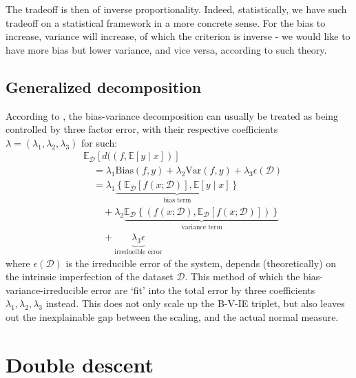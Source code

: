 \documentclass[
  journal=largetwo,
  year=2025,
  volume=37,
]{cup-journal}
\begin{document}
The tradeoff is then of inverse proportionality. Indeed, statistically, we have such tradeoff on a statistical framework in a more concrete sense. For the bias to increase, variance will increase, of which the criterion is inverse - we would like to have more bias but lower variance, and vice versa, according to such theory.

\subsection{Generalized decomposition}

According to \cite{domingos_unified_aaai_2000,domingos_unified_2000}, the bias-variance decomposition can usually be treated as being controlled by three factor error, with their respective coefficients $\lambda=(\lambda_{1},\lambda_{2},\lambda_{3})$ for such: 
    \noindent 
    \begin{equation*}
        \begin{split}
            &\mathbb{E}_{\mathcal{D}} \left[d((f,\mathbb{E}[y\mid x])\right] \\
            & \quad = \lambda_{1} \mathrm{Bias}(f,y) + \lambda_{2}\mathrm{Var}(f,y)+ \lambda_{3}\epsilon(\mathcal{D})\\ 
            & \quad = \lambda_{1}\underbrace{\left\{ \mathbb{E}_{\mathcal{D}}[f(x;\mathcal{D})] , \mathbb{E}[y\mid x] \right\}}_{\text{bias term}} \\
            &\quad\quad +\lambda_{2} \underbrace{\mathbb{E}_{\mathcal{D}} \left\{(f(x;\mathcal{D}), \mathbb{E}_{\mathcal{D}}[f(x;\mathcal{D})])\right\}}_{\text{variance term}} \\
            &\quad\quad +\underbrace{\lambda_{3}\epsilon}_{\text{irreducible error}}
        \end{split}
        \end{equation*}
where $\epsilon(\mathcal{D})$ is the irreducible error of the system, depends (theoretically) on the intrinsic imperfection of the dataset $\mathcal{D}$. This method of which the bias-variance-irreducible error are `fit' into the total error by three coefficients $\lambda_{1},\lambda_{2},\lambda_{3}$ instead. This does not only scale up the B-V-IE triplet, but also leaves out the inexplainable gap between the scaling, and the actual normal measure. 

\section{Double descent}
\end{document}
